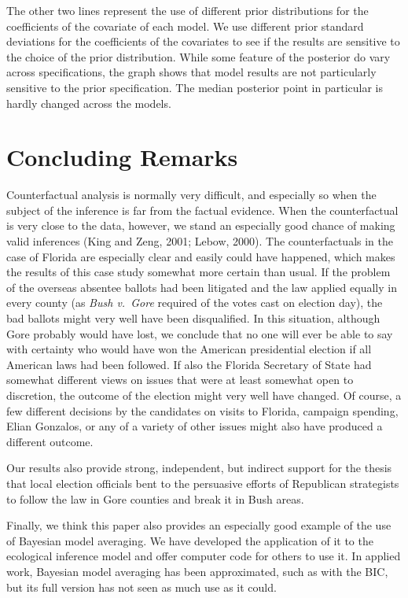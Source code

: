 \documentclass[11pt,titlepage]{article}
\begin{document}
The other two lines represent the use of different prior distributions
for the coefficients of the covariate of each model.  We use different
prior standard deviations for the coefficients of the covariates to
see if the results are sensitive to the choice of the prior
distribution.  While some feature of the posterior do vary across
specifications, the graph shows that model results are not
particularly sensitive to the prior specification.  The median
posterior point in particular is hardly changed across the models.

\section{Concluding Remarks}\label{s:concl}

Counterfactual analysis is normally very difficult, and especially so
when the subject of the inference is far from the factual evidence.
When the counterfactual is very close to the data, however, we stand
an especially good chance of making valid inferences (King and Zeng,
2001; Lebow, 2000)\nocite{KinZen01,Lebow00}.  The counterfactuals in
the case of Florida are especially clear and easily could have
happened, which makes the results of this case study somewhat more
certain than usual.  If the problem of the overseas absentee ballots
had been litigated and the law applied equally in every county (as
\emph{Bush v.\ Gore} required of the votes cast on election day), the
bad ballots might very well have been disqualified.  In this
situation, although Gore probably would have lost, we conclude that no
one will ever be able to say with certainty who would have won the
American presidential election if all American laws had been followed.
If also the Florida Secretary of State had somewhat different views on
issues that were at least somewhat open to discretion, the outcome of
the election might very well have changed.  Of course, a few different
decisions by the candidates on visits to Florida, campaign spending,
Elian Gonzalos, or any of a variety of other issues might also have
produced a different outcome.

Our results also provide strong, independent, but indirect support for
the thesis that local election officials bent to the persuasive
efforts of Republican strategists to follow the law in Gore counties
and break it in Bush areas.

Finally, we think this paper also provides an especially good example
of the use of Bayesian model averaging.  We have developed the
application of it to the ecological inference model and offer computer
code for others to use it.  In applied work, Bayesian model averaging
has been approximated, such as with the BIC, but its full version has
not seen as much use as it could.
\end{document}
